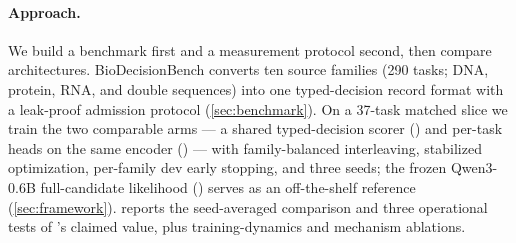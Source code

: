 \paragraph{Approach.}
We build a benchmark first and a measurement protocol second, then compare architectures.
BioDecisionBench converts ten source families (290 tasks; DNA, protein, RNA, and double
sequences) into one typed-decision record format with a leak-proof admission protocol
(\cref{sec:benchmark}). On a 37-task matched slice we train the two comparable arms --- a
shared typed-decision scorer () and per-task heads on the same encoder ()
--- with family-balanced interleaving, stabilized optimization, per-family dev early
stopping, and three seeds; the frozen Qwen3-0.6B full-candidate likelihood () serves
as an off-the-shelf reference (\cref{sec:framework}).  reports the
seed-averaged comparison and three operational tests of 's claimed value, plus
training-dynamics and mechanism ablations.

